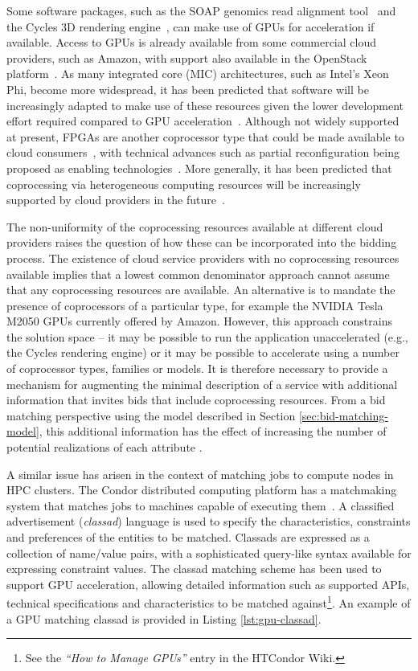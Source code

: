 \documentclass[10pt, conference, compsocconf]{IEEEtran}
\begin{document}
Some software packages, such as the SOAP genomics read alignment tool~\cite{liu2012soap3} and the Cycles 3D rendering engine~\cite{valenza2013blender}, can make use of GPUs for acceleration if available. Access to GPUs is already available from some commercial cloud providers, such as Amazon, with support also available in the OpenStack platform~\cite{crago2011heterogeneous}. As many integrated core (MIC) architectures, such as Intel’s Xeon Phi, become more widespread, it has been predicted that software will be increasingly adapted to make use of these resources given the lower development effort required compared to GPU acceleration~\cite{adie2012accelerators}. Although not widely supported at present, FPGAs are another coprocessor type that could be made available to cloud consumers~\cite{madhavapeddy2011reconfigurable}, with technical advances such as partial reconfiguration being proposed as enabling technologies~\cite{opitz2012accelerating}. More generally, it has  been predicted that coprocessing via heterogeneous computing resources will be increasingly supported by cloud providers in the future~\cite{singh2011computing}.

The non-uniformity of the coprocessing resources available at different cloud providers raises the question of how these can be incorporated into the bidding process. The existence of cloud service providers with no coprocessing resources available implies that a lowest common denominator approach cannot assume that any coprocessing resources are available. An alternative is to mandate the presence of coprocessors of a particular type, for example the NVIDIA Tesla M2050 GPUs currently offered by Amazon. However, this approach constrains the solution space -- it may be possible to run the application unaccelerated (e.g., the Cycles rendering engine) or it may be possible to accelerate using a number of coprocessor types, families or models. It is therefore necessary to provide a mechanism for augmenting the minimal description of a service with additional information that invites bids that include coprocessing resources. From a bid matching perspective using the model described in Section \ref{sec:bid-matching-model}, this additional information has the effect of increasing the number of potential realizations of each attribute .

A similar issue has arisen in the context of matching jobs to compute nodes in HPC clusters. The Condor distributed computing platform has a matchmaking system that matches jobs to machines capable of executing them~\cite{raman2003policy}. A classified advertisement (\textit{classad}) language is used to specify the characteristics, constraints and preferences of the entities to be matched. Classads are expressed as a collection of \mbox{name/value} pairs, with a sophisticated query-like syntax available for expressing constraint values. The classad matching scheme has been used to support GPU acceleration, allowing detailed information such as supported APIs, technical specifications and characteristics to be matched against\footnote{See the \textit{``How to Manage GPUs''} entry in the HTCondor Wiki.}. An example of a GPU matching classad is provided in Listing \ref{lst:gpu-classad}.
\end{document}
